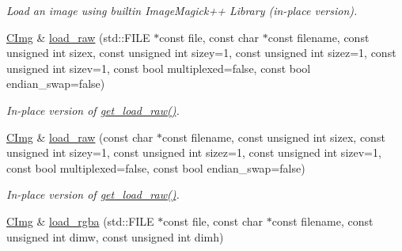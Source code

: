\begin{DoxyCompactItemize}
\begin{DoxyCompactList}\small\item\em Load an image using builtin ImageMagick++ Library (in-\/place version). \item\end{DoxyCompactList}\item 
\hypertarget{structcimg__library_1_1_c_img_ac18432a55ad280d361ee1c01f6b09e12}{
\hyperlink{structcimg__library_1_1_c_img}{CImg} \& \hyperlink{structcimg__library_1_1_c_img_ac18432a55ad280d361ee1c01f6b09e12}{load\_\-raw} (std::FILE $\ast$const file, const char $\ast$const filename, const unsigned int sizex, const unsigned int sizey=1, const unsigned int sizez=1, const unsigned int sizev=1, const bool multiplexed=false, const bool endian\_\-swap=false)}
\label{structcimg__library_1_1_c_img_ac18432a55ad280d361ee1c01f6b09e12}

\begin{DoxyCompactList}\small\item\em In-\/place version of \hyperlink{structcimg__library_1_1_c_img_a980e8f9a7706398cfca97eca26b97a70}{get\_\-load\_\-raw()}. \item\end{DoxyCompactList}\item 
\hypertarget{structcimg__library_1_1_c_img_a0171ebf5428cdeb65d0cf5bdc38d4aef}{
\hyperlink{structcimg__library_1_1_c_img}{CImg} \& \hyperlink{structcimg__library_1_1_c_img_a0171ebf5428cdeb65d0cf5bdc38d4aef}{load\_\-raw} (const char $\ast$const filename, const unsigned int sizex, const unsigned int sizey=1, const unsigned int sizez=1, const unsigned int sizev=1, const bool multiplexed=false, const bool endian\_\-swap=false)}
\label{structcimg__library_1_1_c_img_a0171ebf5428cdeb65d0cf5bdc38d4aef}

\begin{DoxyCompactList}\small\item\em In-\/place version of \hyperlink{structcimg__library_1_1_c_img_a980e8f9a7706398cfca97eca26b97a70}{get\_\-load\_\-raw()}. \item\end{DoxyCompactList}\item 
\hypertarget{structcimg__library_1_1_c_img_a9e2cf5e1fef554bb0cff540e683662f3}{
\hyperlink{structcimg__library_1_1_c_img}{CImg} \& \hyperlink{structcimg__library_1_1_c_img_a9e2cf5e1fef554bb0cff540e683662f3}{load\_\-rgba} (std::FILE $\ast$const file, const char $\ast$const filename, const unsigned int dimw, const unsigned int dimh)}
\label{structcimg__library_1_1_c_img_a9e2cf5e1fef554bb0cff540e683662f3}


\end{DoxyCompactItemize}
